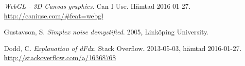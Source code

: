 \documentclass[conference]{IEEEtran}
\begin{document}
\begin{thebibliography}{1}

  \emph{WebGL - 3D Canvas graphics}. Can I Use. Hämtad 2016-01-27. \url{http://caniuse.com/\#feat=webgl}

  Gustavson, S. \emph{Simplex noise demystified}. 2005, Linköping University.

  Dodd, C. \emph{Explanation of dFdx}. Stack Overflow. 2013-05-03, hämtad 2016-01-27. \url{http://stackoverflow.com/a/16368768}

\end{thebibliography}

\end{document}
